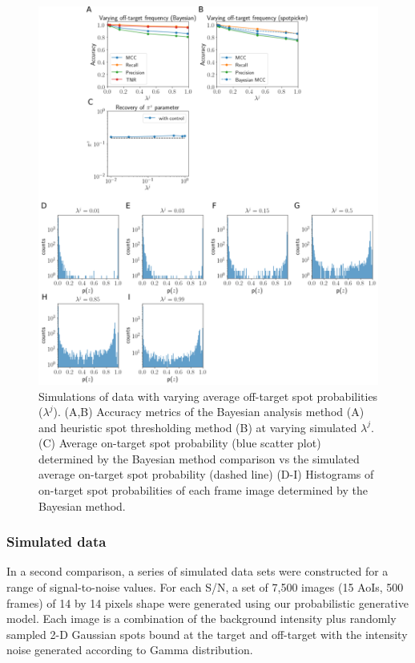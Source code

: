 \begin{figure}
\includegraphics[width=\linewidth]{figures/figure6/figure6.png}
\caption{Simulations of data with varying average off-target spot probabilities ($\lambda^j$). (A,B) Accuracy metrics of the Bayesian analysis method (A) and heuristic spot thresholding method (B) at varying simulated $\lambda^j$. (C) Average on-target spot probability (blue scatter plot) determined by the Bayesian method comparison vs the simulated average on-target spot probability (dashed line) (D-I) Histograms of on-target spot probabilities of each frame image determined by the Bayesian method.}
\label{fig:real_data}
\end{figure}

\subsubsection{Simulated data}

In a second comparison, a series of simulated data sets were constructed for a range of signal-to-noise values. For each S/N, a set of 7,500 images (15 AoIs, 500 frames) of 14 by 14 pixels shape were generated using our probabilistic generative model. Each image is a combination of the background intensity plus randomly sampled 2-D Gaussian spots bound at the target and off-target with the intensity noise generated according to Gamma distribution.

